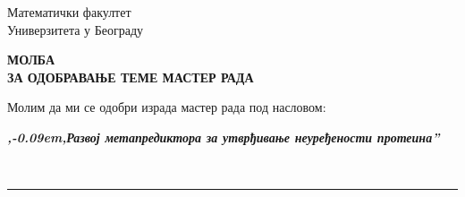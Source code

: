 \documentclass[a4paper]{article}
\def\zn{,\kern-0.09em,}
\begin{document}
\thispagestyle{empty}

\begin{flushleft}
Математички факултет\\
Универзитета у Београду
\end{flushleft}

\bigskip

\begin{center}
\textbf{МОЛБА\\
ЗА ОДОБРАВАЊЕ ТЕМЕ МАСТЕР РАДА
}\end{center}

\bigskip

\begin{flushleft}
Молим да ми се одобри израда мастер рада под насловом:
\end{flushleft}

\begin{minipage}{16.5cm}
\textbf{\textit{\zn Развој метапредиктора за утврђивање неуређености протеина''}}
\end{minipage}\\
\rule[4mm]{17.5cm}{.05mm}
\end{document}
